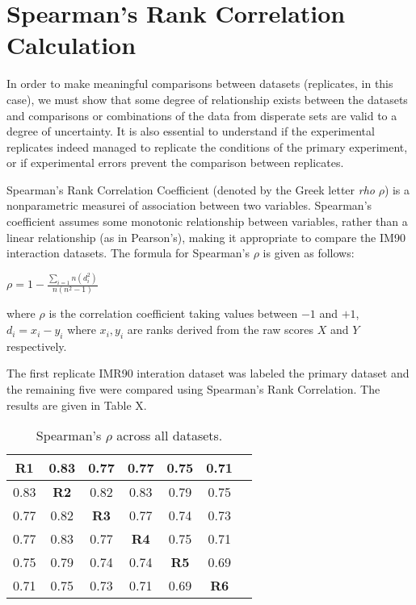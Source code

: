 \documentclass[phd,tocprelim]{cornell}
\begin{document}
\chapter{Spearman's Rank Correlation Calculation}

In order to make meaningful comparisons between datasets (replicates,
in this case), we must show that some degree of relationship exists between
the datasets and comparisons or combinations of the data from disperate sets
are valid to a degree of uncertainty.  It is also essential to understand if the
experimental replicates indeed managed to replicate the conditions of the primary
experiment, or if experimental errors prevent the comparison between replicates.

Spearman's Rank Correlation Coefficient (denoted by the Greek letter \textit{rho}
$\rho$) is a nonparametric measurei of association between two variables.
Spearman's coefficient assumes some monotonic relationship between variables,
rather than a linear relationship (as in Pearson's), making it appropriate
to compare the IM90 interaction datasets.  The formula for Spearman's $\rho$ is
given as follows:

$
\rho = 1 - \frac{\sum_{i=1}{n}(d_i^2)}{n(n^2 - 1)}
$

where $\rho$ is the correlation coefficient taking values between $-1$ and $+1$,
$d_i = x_i - y_i$ where $x_i, y_i$ are ranks derived from the raw scores $X$ and
$Y$ respectively.


The first replicate IMR90 interation dataset was labeled the primary dataset
and the remaining five were compared using Spearman's Rank Correlation.  The
results are given in Table X.

\begin{table}
  \begin{tabular}{|c|*{6}{c|}}
    \toprule
    \textbf{R1} & 0.83 & 0.77 & 0.77 & 0.75 & 0.71 \\ \midrule
    0.83 & \textbf{R2} & 0.82 & 0.83 & 0.79 & 0.75 \\ \midrule
    0.77 & 0.82 & \textbf{R3} & 0.77 & 0.74 & 0.73 \\ \midrule
    0.77 & 0.83 & 0.77 & \textbf{R4} & 0.75 & 0.71 \\ \midrule
    0.75 & 0.79 & 0.74 & 0.74 & \textbf{R5} & 0.69 \\ \midrule
    0.71 & 0.75 & 0.73 & 0.71 & 0.69 & \textbf{R6} \\
    \bottomrule
  \end{tabular}
  \caption{Spearman's $\rho$ across all datasets.}
\label{tab:correlations}
\end{table}

%
%


\end{document}
